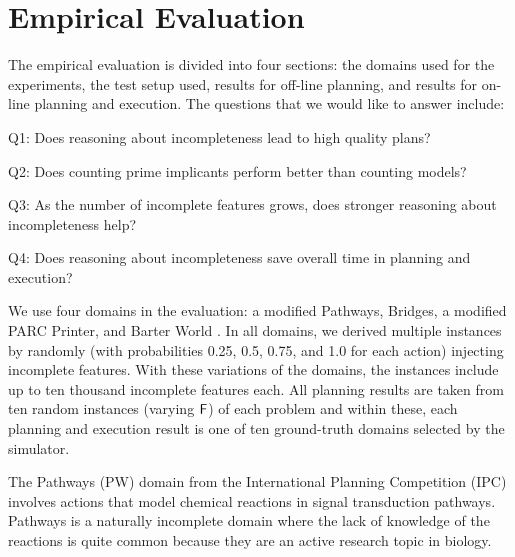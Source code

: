 \documentclass{article}
\def\citep#1{\cite{#1}} \def\citet#1{\citeA{#1}}
\def\und#1{\noindent{\bf #1}:}
\newenvironment{packed_itemize}{
\begin{itemize}
  \setlength{\itemsep}{1pt}
  \setlength{\parskip}{0pt}
  \setlength{\parsep}{0pt}
}{\end{itemize}}
\def\und#1{\medskip{\noindent\bf #1:}}
\begin{document}
\section{Empirical Evaluation}\label{sec:empirical}
%
The empirical evaluation is divided into four sections:  the domains used for the experiments, the test setup used, results for off-line planning, and results for on-line planning and execution.  The questions that we would like to answer include: 
\begin{packed_itemize}
\item Q1: Does reasoning about incompleteness lead to high quality plans?
\item Q2: Does counting prime implicants perform better than counting models?
\item Q3: As the number of incomplete features grows, does stronger reasoning
about incompleteness help?
\item Q4: Does reasoning about incompleteness save overall time in planning and execution?
\end{packed_itemize}





\und{Domains} We use four domains in the evaluation: a modified Pathways,
Bridges,  a modified PARC Printer, and Barter World \citep{bryce-icaps11}.  In
all domains, we derived multiple instances by randomly (with probabilities 0.25,
0.5, 0.75, and 1.0 for each action) injecting incomplete  features.   
With these variations of the domains, the instances include up to ten thousand
incomplete  features each. All planning results are taken from ten random
instances (varying $\sf F$) of each problem and within these, each planning
and execution result is one of ten ground-truth domains selected by the
simulator.

The Pathways (PW) domain from the International Planning Competition  (IPC) involves actions that model chemical reactions in signal
transduction pathways.  Pathways is a naturally incomplete domain where the lack
of knowledge of the reactions is quite common because they are an active
research topic in biology.  
\end{document}

